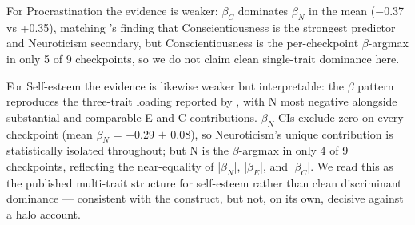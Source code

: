 \documentclass[11pt]{article}
\begin{document}
For Procrastination the evidence is weaker: $\beta_C$ dominates $\beta_N$ in the mean ($-$0.37 vs +0.35), matching \citet{steel2007}'s finding that Conscientiousness is the strongest predictor and Neuroticism secondary, but Conscientiousness is the per-checkpoint $\beta$-argmax in only 5 of 9 checkpoints, so we do not claim clean single-trait dominance here.

For Self-esteem the evidence is likewise weaker but interpretable: the $\beta$ pattern reproduces the three-trait loading reported by \citet{robins2001}, with N most negative alongside substantial and comparable E and C contributions. $\beta_N$ CIs exclude zero on every checkpoint (mean $\beta_N$ = $-$0.29 $\pm$ 0.08), so Neuroticism's unique contribution is statistically isolated throughout; but N is the $\beta$-argmax in only 4 of 9 checkpoints, reflecting the near-equality of |$\beta_N$|, |$\beta_E$|, and |$\beta_C$|. We read this as the published multi-trait structure for self-esteem rather than clean discriminant dominance — consistent with the construct, but not, on its own, decisive against a halo account.

\begin{table}[ht!]
\centering
\caption{Standardized $\beta$ coefficients from multiple regression of each domain score on all five Big Five predictors simultaneously (z-scored inputs and outcomes). Values are mean $\pm$ SD across all trained checkpoints (five Qwen seeds, four Llama-3-8B-4bit seeds; n = 9). Target: the theoretically dominant trait and direction per meta-analytic literature. Argmax match: fraction of checkpoints where the largest-magnitude $\beta$ corresponds to the target trait. R$^2$: mean variance explained. The target-trait $\beta$ CI excludes zero in every domain.}
\end{table}
\end{document}
